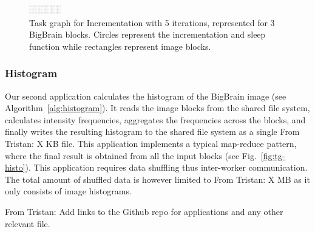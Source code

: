 \documentclass[conference]{IEEEtran}
\newcommand{\TG}[1]{\color{cyan}From Tristan: #1 \color{black}}
\begin{document}
\begin{algorithm}[!b]
    \caption{Incrementation (adapted from~\cite{hayot2019performance})}\label{alg:incrementation}
    \begin{algorithmic}
        \EndFor
    \EndFor
\end{algorithmic}
\end{algorithm}

\begin{figure}[!b]
    \centering
    \includegraphics[width=0.125\textwidth,
    angle=-90]{images/incrementation-task-graph.png}
    \caption{Task graph for Incrementation with 5 iterations, represented
    for 3 BigBrain blocks. Circles represent the incrementation and sleep
    function while rectangles represent image blocks.}\label{fig:tg-inc}
\end{figure}

\subsubsection{Histogram}

 Our second application calculates the histogram of the BigBrain image (see
 Algorithm~\ref{alg:histogram}). It reads the image blocks from the shared
 file system, calculates intensity frequencies, aggregates the frequencies
 across the blocks, and finally writes the resulting histogram to the
 shared file system as a single \TG{X}KB file. This application implements
 a typical map-reduce pattern, where the final result is obtained from all
 the input blocks (see Fig.~\ref{fig:tg-histo}). This application requires
 data shuffling thus inter-worker communication. The total amount of shuffled
 data is however limited to \TG{X}MB as it only consists of image
 histograms.

 \TG{Add links to the Github repo for applications and any other relevant file.}

\begin{algorithm}[!t]
    \caption{Histogram}\label{alg:histogram}
    \begin{algorithmic}
    \EndFor
    

    \end{algorithmic}
\end{algorithm}
\end{document}
